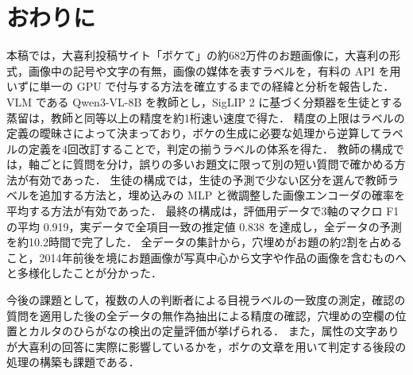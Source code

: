 \section{おわりに}
\label{sec_conclusion}
本稿では，大喜利投稿サイト「ボケて」の約682万件のお題画像に，大喜利の形式，画像中の記号や文字の有無，画像の媒体を表すラベルを，有料の API を用いずに単一の GPU で付与する方法を確立するまでの経緯と分析を報告した．
VLM である Qwen3-VL-8B を教師とし，SigLIP 2 に基づく分類器を生徒とする蒸留は，教師と同等以上の精度を約1桁速い速度で得た．
精度の上限はラベルの定義の曖昧さによって決まっており，ボケの生成に必要な処理から逆算してラベルの定義を4回改訂することで，判定の揃うラベルの体系を得た．
教師の構成では，軸ごとに質問を分け，誤りの多いお題文に限って別の短い質問で確かめる方法が有効であった．
生徒の構成では，生徒の予測で少ない区分を選んで教師ラベルを追加する方法と，埋め込みの MLP と微調整した画像エンコーダの確率を平均する方法が有効であった．
最終の構成は，評価用データで3軸のマクロ F1 の平均 0.919，実データで全項目一致の推定値 0.838 を達成し，全データの予測を約10.2時間で完了した．
全データの集計から，穴埋めがお題の約2割を占めること，2014年前後を境にお題画像が写真中心から文字や作品の画像を含むものへと多様化したことが分かった．

今後の課題として，複数の人の判断者による目視ラベルの一致度の測定，確認の質問を適用した後の全データの無作為抽出による精度の確認，穴埋めの空欄の位置とカルタのひらがなの検出の定量評価が挙げられる．
また，属性の文字ありが大喜利の回答に実際に影響しているかを，ボケの文章を用いて判定する後段の処理の構築も課題である．
